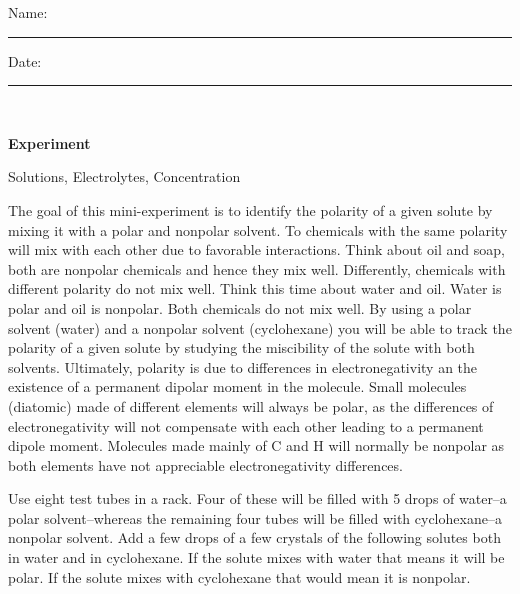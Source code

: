 \documentclass[main.tex]{subfiles}
\begin{document}
\clearpage\mbox{}\clearpage



\begin{multicols}{2}
\begin{tcolorbox}[enhanced jigsaw,breakable,size=title,
colback=mybrown!05,colframe=black,fonttitle=\bfseries,
title=STUDENT INFO,pad at break=1mm, break at=15cm/0pt ]
\vspace{0.2cm}
\noindent Name: \rule{5cm}{0.4pt}Date:\rule{1cm}{0.4pt}\\
 \end{tcolorbox}
\end{multicols}
\hfill
\vspace{0.2cm}
\begin{center}
{\large \bfseries 
Experiment
\par
\Huge
Solutions, Electrolytes, Concentration 
\\[5pt] \par}
\vspace{0.2cm}
\end{center}
\par
\noindent
\uline{  \hfill \normalsize \hfill       }

\vspace{0.2cm}{\large \bfseries 1. Polarity and miscibility}
The goal of this mini-experiment is to identify the polarity of a given solute by mixing it with a polar and nonpolar solvent. To chemicals with the same polarity will mix with each other due to favorable interactions. Think about oil and soap, both are nonpolar chemicals and hence they mix well. Differently, chemicals with different polarity do not mix well. Think this time about water and oil. Water is polar and oil is nonpolar. Both chemicals do not mix well. By using a polar solvent (water) and a nonpolar solvent (cyclohexane) you will be able to track the polarity of a given solute by studying the miscibility of the solute with both solvents. Ultimately, polarity is due to differences in electronegativity an the existence of a permanent dipolar moment in the molecule. Small molecules (diatomic) made of different elements will always be polar, as the differences of electronegativity will not compensate with each other leading to a permanent dipole moment. Molecules made mainly of C and H will normally be nonpolar as both elements have not appreciable electronegativity differences.
\begin{steps}
    \newstep[] Use eight test tubes in a rack. Four of these will be filled with 5 drops of water--a polar solvent--whereas the remaining four tubes will be filled with cyclohexane--a nonpolar solvent.
    \newstep[] Add a few drops of a few crystals of the following solutes both in water and in cyclohexane. If the solute mixes with water that means it will be polar. If the solute mixes with cyclohexane that would mean it is nonpolar.
\end{steps}
\end{document}
